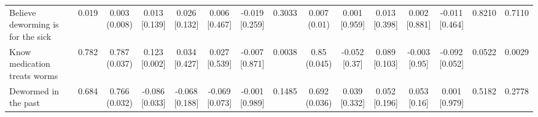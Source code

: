 \documentclass[
]{article}
\begin{document}
\begin{table}[htbp]
{\begin{tabular}[t]{lcccccccccccccc}
\hspace{1em}Believe deworming is for the sick & 0.019 & \makecell[c]{0.003\\(0.008)} & \makecell[c]{0.013\\{[0.139]}} & \makecell[c]{0.026\\{[0.132]}} & \makecell[c]{0.006\\{[0.467]}} & \makecell[c]{-0.019\\{[0.259]}} & 0.3033 & \makecell[c]{0.007\\(0.01)} & \makecell[c]{0.001\\{[0.959]}} & \makecell[c]{0.013\\{[0.398]}} & \makecell[c]{0.002\\{[0.881]}} & \makecell[c]{-0.011\\{[0.464]}} & 0.8210 & 0.7110\\
\hspace{1em}Know medication treats worms & 0.782 & \makecell[c]{0.787\\(0.037)} & \makecell[c]{0.123\\{[0.002]}} & \makecell[c]{0.034\\{[0.427]}} & \makecell[c]{0.027\\{[0.539]}} & \makecell[c]{-0.007\\{[0.871]}} & 0.0038 & \makecell[c]{0.85\\(0.045)} & \makecell[c]{-0.052\\{[0.37]}} & \makecell[c]{0.089\\{[0.103]}} & \makecell[c]{-0.003\\{[0.95]}} & \makecell[c]{-0.092\\{[0.052]}} & 0.0522 & 0.0029\\
\hspace{1em}Dewormed in the past & 0.684 & \makecell[c]{0.766\\(0.032)} & \makecell[c]{-0.086\\{[0.033]}} & \makecell[c]{-0.068\\{[0.188]}} & \makecell[c]{-0.069\\{[0.073]}} & \makecell[c]{-0.001\\{[0.989]}} & 0.1485 & \makecell[c]{0.692\\(0.036)} & \makecell[c]{0.039\\{[0.332]}} & \makecell[c]{0.052\\{[0.196]}} & \makecell[c]{0.053\\{[0.16]}} & \makecell[c]{0.001\\{[0.979]}} & 0.5182 & 0.2778\\

\end{tabular}}
\end{table}
\end{document}
